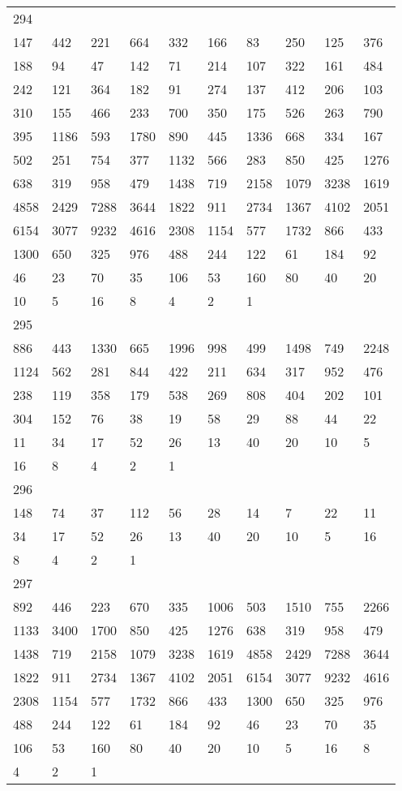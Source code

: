 \begin{longtable}{*{10}{l}}
294&&&&&&&&&\\
147& 442& 221& 664& 332& 166& 83& 250& 125& 376\\
188& 94& 47& 142& 71& 214& 107& 322& 161& 484\\
242& 121& 364& 182& 91& 274& 137& 412& 206& 103\\
310& 155& 466& 233& 700& 350& 175& 526& 263& 790\\
395& 1186& 593& 1780& 890& 445& 1336& 668& 334& 167\\
502& 251& 754& 377& 1132& 566& 283& 850& 425& 1276\\
638& 319& 958& 479& 1438& 719& 2158& 1079& 3238& 1619\\
4858& 2429& 7288& 3644& 1822& 911& 2734& 1367& 4102& 2051\\
6154& 3077& 9232& 4616& 2308& 1154& 577& 1732& 866& 433\\
1300& 650& 325& 976& 488& 244& 122& 61& 184& 92\\
46& 23& 70& 35& 106& 53& 160& 80& 40& 20\\
10& 5& 16& 8& 4& 2& 1& \\

295&&&&&&&&&\\
886& 443& 1330& 665& 1996& 998& 499& 1498& 749& 2248\\
1124& 562& 281& 844& 422& 211& 634& 317& 952& 476\\
238& 119& 358& 179& 538& 269& 808& 404& 202& 101\\
304& 152& 76& 38& 19& 58& 29& 88& 44& 22\\
11& 34& 17& 52& 26& 13& 40& 20& 10& 5\\
16& 8& 4& 2& 1& \\

296&&&&&&&&&\\
148& 74& 37& 112& 56& 28& 14& 7& 22& 11\\
34& 17& 52& 26& 13& 40& 20& 10& 5& 16\\
8& 4& 2& 1& \\

297&&&&&&&&&\\
892& 446& 223& 670& 335& 1006& 503& 1510& 755& 2266\\
1133& 3400& 1700& 850& 425& 1276& 638& 319& 958& 479\\
1438& 719& 2158& 1079& 3238& 1619& 4858& 2429& 7288& 3644\\
1822& 911& 2734& 1367& 4102& 2051& 6154& 3077& 9232& 4616\\
2308& 1154& 577& 1732& 866& 433& 1300& 650& 325& 976\\
488& 244& 122& 61& 184& 92& 46& 23& 70& 35\\
106& 53& 160& 80& 40& 20& 10& 5& 16& 8\\
4& 2& 1& \\


\end{longtable}
